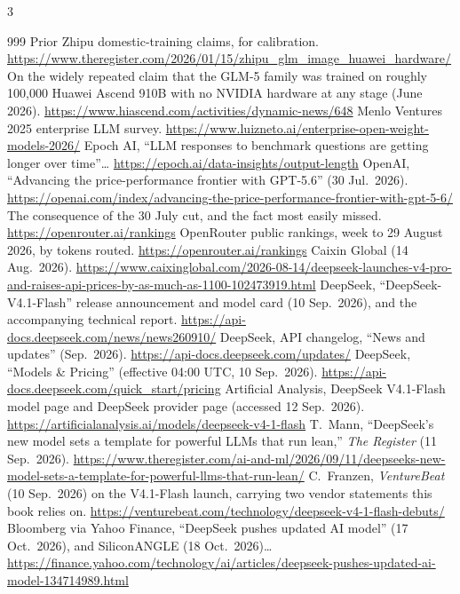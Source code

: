 \begin{multicols}{3}
\begin{thebibliography}{999}
 Prior Zhipu domestic-training claims, for calibration. \url{https://www.theregister.com/2026/01/15/zhipu_glm_image_huawei_hardware/}
 On the widely repeated claim that the GLM-5 family was trained on roughly 100{,}000 Huawei Ascend 910B with no NVIDIA hardware at any stage (June 2026). \url{https://www.hiascend.com/activities/dynamic-news/648}
 Menlo Ventures 2025 enterprise LLM survey. \url{https://www.luizneto.ai/enterprise-open-weight-models-2026/}
 Epoch AI, ``LLM responses to benchmark questions are getting longer over time''… \url{https://epoch.ai/data-insights/output-length}
 OpenAI, ``Advancing the price-performance frontier with GPT-5.6'' (30 Jul.\ 2026). \url{https://openai.com/index/advancing-the-price-performance-frontier-with-gpt-5-6/}
 The consequence of the 30 July cut, and the fact most easily missed. \url{https://openrouter.ai/rankings}
 OpenRouter public rankings, week to 29 August 2026, by tokens routed. \url{https://openrouter.ai/rankings}
 Caixin Global (14 Aug.\ 2026). \url{https://www.caixinglobal.com/2026-08-14/deepseek-launches-v4-pro-and-raises-api-prices-by-as-much-as-1100-102473919.html}
 DeepSeek, ``DeepSeek-V4.1-Flash'' release announcement and model card (10 Sep.\ 2026), and the accompanying technical report. \url{https://api-docs.deepseek.com/news/news260910/}
 DeepSeek, API changelog, ``News and updates'' (Sep.\ 2026). \url{https://api-docs.deepseek.com/updates/}
 DeepSeek, ``Models \& Pricing'' (effective 04:00 UTC, 10 Sep.\ 2026). \url{https://api-docs.deepseek.com/quick_start/pricing}
 Artificial Analysis, DeepSeek V4.1-Flash model page and DeepSeek provider page (accessed 12 Sep.\ 2026). \url{https://artificialanalysis.ai/models/deepseek-v4-1-flash}
 T.~Mann, ``DeepSeek's new model sets a template for powerful LLMs that run lean,'' \emph{The Register} (11 Sep.\ 2026). \url{https://www.theregister.com/ai-and-ml/2026/09/11/deepseeks-new-model-sets-a-template-for-powerful-llms-that-run-lean/}
 C.~Franzen, \emph{VentureBeat} (10 Sep.\ 2026) on the V4.1-Flash launch, carrying two vendor statements this book relies on. \url{https://venturebeat.com/technology/deepseek-v4-1-flash-debuts/}
 Bloomberg via Yahoo Finance, ``DeepSeek pushes updated AI model'' (17 Oct.\ 2026), and SiliconANGLE (18 Oct.\ 2026)… \url{https://finance.yahoo.com/technology/ai/articles/deepseek-pushes-updated-ai-model-134714989.html}

\end{thebibliography}
\end{multicols}
